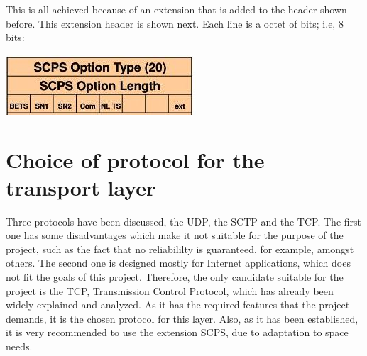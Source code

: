 \documentclass[12pt,a4paper]{report}
\begin{document}
This is all achieved because of an extension that is added to the header shown before. This extension header is shown next. Each line is a octet of bits; i.e, 8 bits:

\includegraphics{TCP3(extension)}


\section{Choice of protocol for the transport layer}
Three protocols have been discussed, the UDP, the SCTP and the TCP. The first one has some disadvantages which make it not suitable for the purpose of the project, such as the fact that no reliabililty is guaranteed, for example, amongst others. The second one is designed mostly for Internet applications, which does not fit the goals of this project. Therefore, the only candidate suitable for the project is the TCP, Transmission Control Protocol, which has already been widely explained and analyzed. As it has the required features that the project demands, it is the chosen protocol for this layer. Also, as it has been established, it is very recommended to use the extension SCPS, due to adaptation to space needs.  
\end{document}
